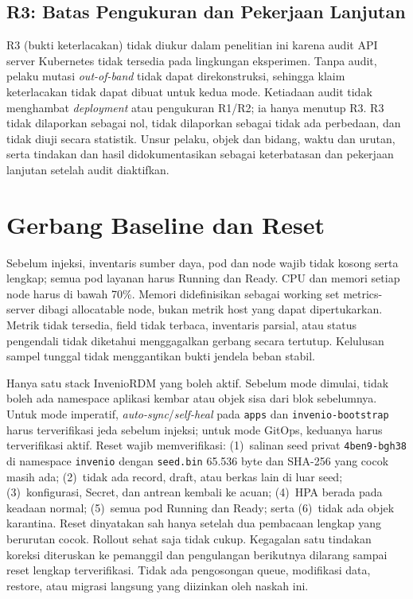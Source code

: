 \subsection{R3: Batas Pengukuran dan Pekerjaan Lanjutan}

R3 (bukti keterlacakan) tidak diukur dalam penelitian ini karena audit API server Kubernetes tidak tersedia pada lingkungan eksperimen. Tanpa audit, pelaku mutasi \textit{out-of-band} tidak dapat direkonstruksi, sehingga klaim keterlacakan tidak dapat dibuat untuk kedua mode. Ketiadaan audit tidak menghambat \textit{deployment} atau pengukuran R1/R2; ia hanya menutup R3. R3 tidak dilaporkan sebagai nol, tidak dilaporkan sebagai tidak ada perbedaan, dan tidak diuji secara statistik. Unsur pelaku, objek dan bidang, waktu dan urutan, serta tindakan dan hasil didokumentasikan sebagai keterbatasan dan pekerjaan lanjutan setelah audit diaktifkan.

\section{Gerbang Baseline dan Reset}

Sebelum injeksi, inventaris sumber daya, pod dan node wajib tidak kosong serta lengkap; semua pod layanan harus Running dan Ready. CPU dan memori setiap node harus di bawah 70\%. Memori didefinisikan sebagai working set metrics-server dibagi allocatable node, bukan metrik host yang dapat dipertukarkan. Metrik tidak tersedia, field tidak terbaca, inventaris parsial, atau status pengendali tidak diketahui menggagalkan gerbang secara tertutup. Kelulusan sampel tunggal tidak menggantikan bukti jendela beban stabil.

Hanya satu stack InvenioRDM yang boleh aktif. Sebelum mode dimulai, tidak boleh ada namespace aplikasi kembar atau objek sisa dari blok sebelumnya. Untuk mode imperatif, \textit{auto-sync}/\textit{self-heal} pada \texttt{apps} dan \texttt{invenio-bootstrap} harus terverifikasi jeda sebelum injeksi; untuk mode GitOps, keduanya harus terverifikasi aktif. Reset wajib memverifikasi: (1)~salinan seed privat \texttt{4ben9-bgh38} di namespace \texttt{invenio} dengan \texttt{seed.bin} 65.536 byte dan SHA-256 yang cocok masih ada; (2)~tidak ada record, draft, atau berkas lain di luar seed; (3)~konfigurasi, Secret, dan antrean kembali ke acuan; (4)~HPA berada pada keadaan normal; (5)~semua pod Running dan Ready; serta (6)~tidak ada objek karantina. Reset dinyatakan sah hanya setelah dua pembacaan lengkap yang berurutan cocok. Rollout sehat saja tidak cukup. Kegagalan satu tindakan koreksi diteruskan ke pemanggil dan pengulangan berikutnya dilarang sampai reset lengkap terverifikasi. Tidak ada pengosongan queue, modifikasi data, restore, atau migrasi langsung yang diizinkan oleh naskah ini.

